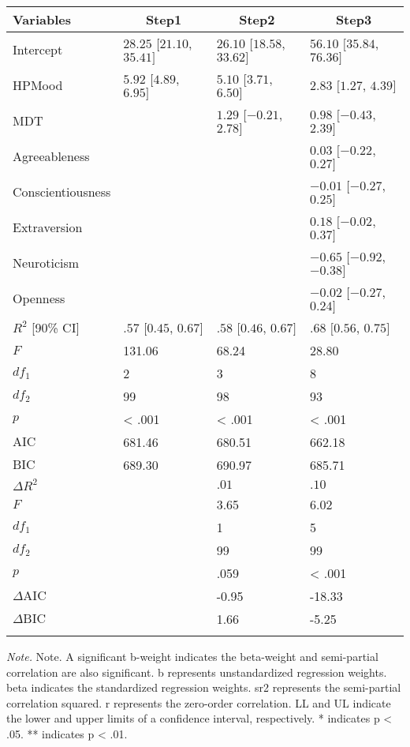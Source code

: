 \documentclass[man,floatsintext]{apa6}
\begin{document}
\begin{table}[tbp]
\begin{center}
\begin{threeparttable}
\caption{\label{tab:unnamed-chunk-2}}
\small{
\begin{tabular}{llll}
\toprule
Variables & \multicolumn{1}{c}{Step1} & \multicolumn{1}{c}{Step2} & \multicolumn{1}{c}{Step3}\\
\midrule
Intercept & $28.25$ $[21.10$, $35.41]$ & $26.10$ $[18.58$, $33.62]$ & $56.10$ $[35.84$, $76.36]$\\
HPMood & $5.92$ $[4.89$, $6.95]$ & $5.10$ $[3.71$, $6.50]$ & $2.83$ $[1.27$, $4.39]$\\
MDT &  & $1.29$ $[-0.21$, $2.78]$ & $0.98$ $[-0.43$, $2.39]$\\
Agreeableness &  &  & $0.03$ $[-0.22$, $0.27]$\\
Conscientiousness &  &  & $-0.01$ $[-0.27$, $0.25]$\\
Extraversion &  &  & $0.18$ $[-0.02$, $0.37]$\\
Neuroticism &  &  & $-0.65$ $[-0.92$, $-0.38]$\\
Openness &  &  & $-0.02$ $[-0.27$, $0.24]$\\
$R^2$ [90\% CI] & $.57$ $[0.45$, $0.67]$ & $.58$ $[0.46$, $0.67]$ & $.68$ $[0.56$, $0.75]$\\
$F$ & 131.06 & 68.24 & 28.80\\
$df_1$ & 2 & 3 & 8\\
$df_2$ & 99 & 98 & 93\\
$p$ & < .001 & < .001 & < .001\\
$\mathrm{AIC}$ & 681.46 & 680.51 & 662.18\\
$\mathrm{BIC}$ & 689.30 & 690.97 & 685.71\\
$\Delta R^2$ &  & $.01$ & $.10$\\
$F$ &  & 3.65 & 6.02\\
$df_1$ &  & 1 & 5\\
$df_2$ &  & 99 & 99\\
$p$ &  & .059 & < .001\\
$\Delta \mathrm{AIC}$ &  & -0.95 & -18.33\\
$\Delta \mathrm{BIC}$ &  & 1.66 & -5.25\\
\bottomrule
\addlinespace
\end{tabular}
}
\begin{tablenotes}[para]
\normalsize{\textit{Note.} Note. A significant b-weight indicates the beta-weight and semi-partial correlation are also significant. b represents unstandardized regression weights. beta indicates the standardized regression weights. sr2 represents the semi-partial correlation squared. r represents the zero-order correlation. LL and UL indicate the lower and upper limits of a confidence interval, respectively.
* indicates p < .05. ** indicates p < .01.
}
\end{tablenotes}
\end{threeparttable}
\end{center}
\end{table}
\end{document}
